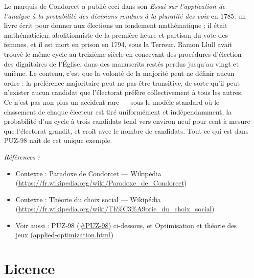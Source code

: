 \documentclass[11pt]{article}
\newenvironment{refs}{\par\small\noindent\emph{Références :}\begin{itemize}\setlength\itemsep{0pt}}{\end{itemize}\normalsize}
\begin{document}
\noindent Le marquis de Condorcet a publié ceci dans son \textit{Essai sur l'application
de l'analyse à la probabilité des décisions rendues à la pluralité des voix} en 1785, un
livre écrit pour donner aux élections un fondement mathématique ; il était mathématicien,
abolitionniste de la première heure et partisan du vote des femmes, et il est mort en prison
en 1794, sous la Terreur. Ramon Llull avait trouvé le même cycle au treizième siècle en
concevant des procédures d'élection des dignitaires de l'Église, dans des manuscrits restés
perdus jusqu'au vingt et unième. Le contenu, c'est que \og{} la volonté de la majorité \fg{} peut ne
définir aucun ordre : la préférence majoritaire peut ne pas être transitive, de sorte qu'il
peut n'exister aucun candidat que l'électorat préfère collectivement à tous les autres. Ce
n'est pas non plus un accident rare --- sous le modèle standard où le classement de chaque
électeur est tiré uniformément et indépendamment, la probabilité d'un cycle à trois candidats
tend vers environ neuf pour cent à mesure que l'électorat grandit, et croît avec le nombre de
candidats. Tout ce qui est dans PUZ-98 naît de cet unique exemple.

\begin{refs}
\item Contexte : Paradoxe de Condorcet --- Wikipédia (\url{https://fr.wikipedia.org/wiki/Paradoxe_de_Condorcet})
\item Contexte : Théorie du choix social --- Wikipédia (\url{https://fr.wikipedia.org/wiki/Th%C3%A9orie_du_choix_social})
\item Voir aussi : PUZ-98 (\url{#PUZ-98}) ci-dessous, et Optimisation et théorie des jeux (\url{applied-optimization.html})
\end{refs}

\bigskip


\section*{Licence}
\end{document}
